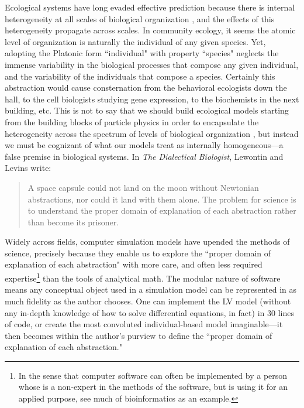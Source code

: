 \documentclass[]{article}
\begin{document}
Ecological systems have long evaded effective prediction because there is internal heterogeneity at all scales of biological organization \citep{levins_dialectical_1987,levin_problem_1992}, and the effects of this heterogeneity propagate across scales.
In community ecology, it seems the atomic level of organization is naturally the individual of any given species.
Yet, adopting the Platonic form ``individual" with property ``species" neglects the immense variability in the biological processes that compose any given individual, and the variability of the individuals that compose a species.
Certainly this abstraction would cause consternation from the behavioral ecologists down the hall, to the cell biologists studying gene expression, to the biochemists in the next building, etc.
This is not to say that we should build ecological models starting from the building blocks of particle physics in order to encapsulate the heterogeneity across the spectrum of levels of biological organization \citep{levin_problem_1992}, but instead we must be cognizant of what our models treat as internally homogeneous---a false premise in biological systems.
In \emph{The Dialectical Biologist}, Lewontin and Levins write:

\begin{quote}
A space capsule could not land on the moon without Newtonian
abstractions, nor could it land with them alone. The problem for science
is to understand the proper domain of explanation of each abstraction
rather than become its prisoner. \citep{levin_problem_1992}
\end{quote}

\clearpage
Widely across fields, computer simulation models have upended the methods of science, precisely because they enable us to explore the
``proper domain of explanation of each abstraction" with more care, and often less required expertise\footnote{In the sense that computer software can often be implemented by a person whose is a non-expert in the methods of the software, but is using it for an applied purpose, see much of bioinformatics as an example.} than the tools of analytical math.
The modular nature of software means any conceptual object used in a simulation model can be represented in as much fidelity as the author chooses.
One can implement the LV model (without any in-depth knowledge of how to solve differential equations, in fact) in 30 lines of code, or create the most convoluted individual-based model imaginable---it then becomes within the author's purview to define the ``proper domain of explanation of each abstraction."
\end{document}
